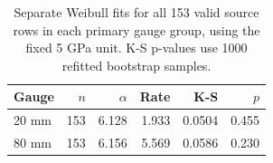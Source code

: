 \begin{table}[htbp]
\centering
\caption{Separate Weibull fits for all 153 valid source rows in each primary gauge group, using the fixed 5 GPa unit. K-S p-values use 1000 refitted bootstrap samples.}\label{tab:primary-gof}
\small
\begin{tabular}{lrrrrr}
\toprule
Gauge & $n$ & $\alpha$ & Rate & K-S & $p$ \\
\midrule
20 mm & 153 & 6.128 & 1.933 & 0.0504 & 0.455 \\
80 mm & 153 & 6.156 & 5.569 & 0.0586 & 0.230 \\
\bottomrule
\end{tabular}
\end{table}
